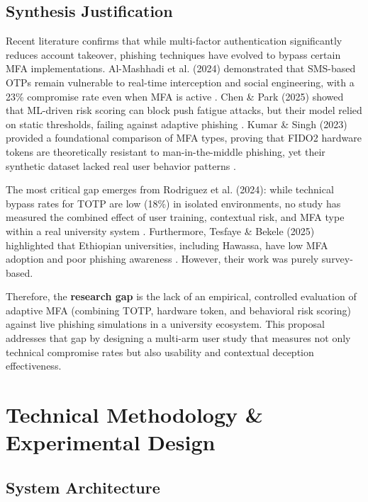 \documentclass[11pt]{article}
\begin{document}
\subsection{Synthesis Justification}
Recent literature confirms that while multi-factor authentication significantly reduces account takeover, phishing techniques have evolved to bypass certain MFA implementations. Al-Mashhadi et al. (2024) demonstrated that SMS-based OTPs remain vulnerable to real-time interception and social engineering, with a 23\% compromise rate even when MFA is active \cite{almashhadi2024sms}. Chen \& Park (2025) showed that ML-driven risk scoring can block push fatigue attacks, but their model relied on static thresholds, failing against adaptive phishing \cite{chen2025mlpush}. Kumar \& Singh (2023) provided a foundational comparison of MFA types, proving that FIDO2 hardware tokens are theoretically resistant to man-in-the-middle phishing, yet their synthetic dataset lacked real user behavior patterns \cite{kumar2023mfatyperesist}.

The most critical gap emerges from Rodriguez et al. (2024): while technical bypass rates for TOTP are low (18\%) in isolated environments, no study has measured the combined effect of user training, contextual risk, and MFA type within a real university system \cite{rodriguez2024evilginx}. Furthermore, Tesfaye \& Bekele (2025) highlighted that Ethiopian universities, including Hawassa, have low MFA adoption and poor phishing awareness \cite{tesfaye2025ethiopia}. However, their work was purely survey-based.

Therefore, the \textbf{research gap} is the lack of an empirical, controlled evaluation of adaptive MFA (combining TOTP, hardware token, and behavioral risk scoring) against live phishing simulations in a university ecosystem. This proposal addresses that gap by designing a multi-arm user study that measures not only technical compromise rates but also usability and contextual deception effectiveness.

\section{Technical Methodology \& Experimental Design}

\subsection{System Architecture}
\end{document}
